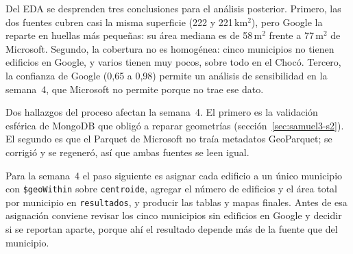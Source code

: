 \documentclass[11pt,a4paper]{article}
\newcommand{\campo}[1]{\texttt{#1}}
\begin{document}
Del EDA se desprenden tres conclusiones para el análisis posterior. Primero, las
dos fuentes cubren casi la misma superficie (222 y 221\,km$^2$), pero Google la
reparte en huellas más pequeñas: su área mediana es de 58\,m$^2$ frente a
77\,m$^2$ de Microsoft. Segundo, la cobertura no es homogénea: cinco municipios
no tienen edificios en Google, y varios tienen muy pocos, sobre todo en el
Chocó. Tercero, la confianza de Google (0,65 a 0,98) permite un análisis de
sensibilidad en la semana~4, que Microsoft no permite porque no trae ese dato.

Dos hallazgos del proceso afectan la semana~4. El primero es la validación
esférica de MongoDB que obligó a reparar geometrías
(sección~\ref{sec:samuel3-s2}). El segundo es que el Parquet de Microsoft no traía
metadatos GeoParquet; se corrigió y se regeneró, así que ambas fuentes se leen
igual.

Para la semana~4 el paso siguiente es asignar cada edificio a un único
municipio con \campo{\$geoWithin} sobre \campo{centroide}, agregar el número de
edificios y el área total por municipio en \campo{resultados}, y producir las
tablas y mapas finales. Antes de esa asignación conviene revisar los cinco
municipios sin edificios en Google y decidir si se reportan aparte, porque ahí el
resultado depende más de la fuente que del municipio.
\end{document}
